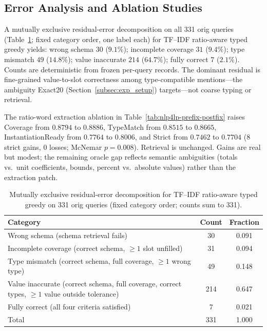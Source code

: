 \documentclass[pdflatex,sn-basic,Numbered]{sn-jnl}
\begin{document}
\subsection{Error Analysis and Ablation Studies}
\label{subsec:exp_error}

A mutually exclusive residual-error decomposition on all 331 orig queries (Table~\ref{tab:nlp4lp-error-taxonomy}; fixed category order, one label each) for TF--IDF ratio-aware typed greedy yields: wrong schema $30$ ($9.1\%$); incomplete coverage $31$ ($9.4\%$); type mismatch $49$ ($14.8\%$); value inaccurate $214$ ($64.7\%$); fully correct $7$ ($2.1\%$). Counts are deterministic from frozen per-query records. The dominant residual is fine-grained value-to-slot correctness among type-compatible mentions---the ambiguity Exact20 (Section~\ref{subsec:exp_setup}) targets---not coarse typing or retrieval.

The ratio-word extraction ablation in Table~\ref{tab:nlp4lp-prefix-postfix} raises Coverage from $0.8794$ to $0.8886$, TypeMatch from $0.8515$ to $0.8665$, InstantiationReady from $0.7764$ to $0.8006$, and Strict from $0.7462$ to $0.7704$ (8 strict gains, 0 losses; McNemar $p=0.008$). Retrieval is unchanged. Gains are real but modest; the remaining oracle gap reflects semantic ambiguities (totals vs.\ unit coefficients, bounds, percent vs.\ absolute values) rather than the extraction patch.

\begin{table}[t]
  \centering
  \caption{Mutually exclusive residual-error decomposition for TF--IDF ratio-aware typed greedy on 331 orig queries (fixed category order; counts sum to 331).}
  \label{tab:nlp4lp-error-taxonomy}
  \small
  \setlength{\tabcolsep}{4pt}
  \begin{tabular}{p{7.4cm}cc}
    \toprule
    Category & Count & Fraction \\
    \midrule
    Wrong schema (schema retrieval fails) & 30 & 0.091 \\
    Incomplete coverage (correct schema, $\geq 1$ slot unfilled) & 31 & 0.094 \\
    Type mismatch (correct schema, full coverage, $\geq 1$ wrong type) & 49 & 0.148 \\
    Value inaccurate (correct schema, full coverage, correct types, $\geq 1$ value outside tolerance) & 214 & 0.647 \\
    Fully correct (all four criteria satisfied) & 7 & 0.021 \\
    \midrule
    Total & 331 & 1.000 \\
    \bottomrule
  \end{tabular}
\end{table}
\end{document}
